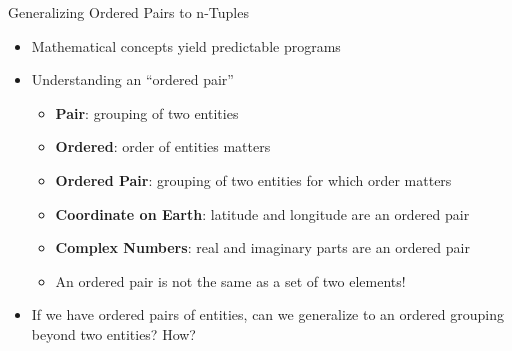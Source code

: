 \documentclass[14pt,aspectratio=169]{beamer}
\begin{document}
%
\begin{frame}{Generalizing Ordered Pairs to n-Tuples}
  \begin{itemize}
    \item Mathematical concepts yield predictable programs
      \vspace*{-.15in}
    \item Understanding an ``ordered pair''
      \begin{itemize}
        \item {\bf Pair}: grouping of two entities
        \item {\bf Ordered}: order of entities matters
        \item {\bf Ordered Pair}: grouping of two entities for which order
          matters
        \item {\bf Coordinate on Earth}: latitude and longitude are an ordered
          pair
        \item {\bf Complex Numbers}: real and imaginary parts are an ordered
          pair
        \item An ordered pair is not the same as a set of two elements!
      \end{itemize}
      \vspace*{-.2in}
    \item If we have ordered pairs of entities, can we generalize to
      an ordered grouping beyond two entities? How?
  \end{itemize}
\end{frame}
\end{document}
